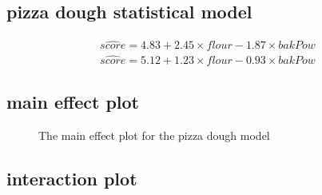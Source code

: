 \documentclass[
  a4paper,
]{scrbook}
\begin{document}
\subsection{pizza dough statistical
model}\label{pizza-dough-statistical-model}

\begin{align}
\widehat{score} = 4.83 + 2.45\times flour  -1.87 \times bakPow \\
\widehat{score} = 5.12 + 1.23\times flour  -0.93 \times bakPow
\end{align}

\subsection{main effect plot}\label{main-effect-plot}

\begin{figure}[ht]


\caption{\label{fig-pd-me}The main effect plot for the pizza dough
model}

\end{figure}%

\subsection{interaction plot}\label{interaction-plot}
\end{document}
